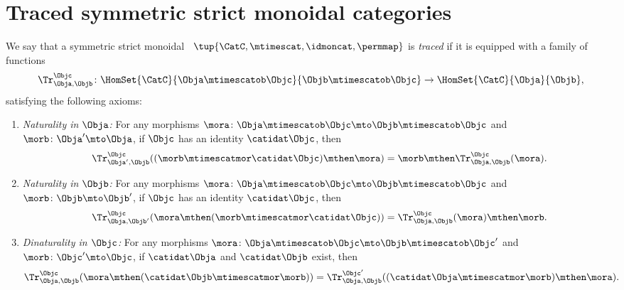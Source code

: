 
\section{Traced symmetric strict monoidal categories}
\publictodomessage


\begin{widepar}
    \begin{ctdefinition}
        \label{def:traced-sym-strict-mon-cat}
        We say that a symmetric strict monoidal  ~$\tup{\CatC, \mtimescat, \idmoncat, \permmap}$ is \emph{traced} if it is equipped with a family of functions
        \begin{equation}\label{eq:trace-def-trace-map}
            \Tr_{\Obja,\Objb}^\Objc\colon \HomSet{\CatC}{\Obja \mtimescatob \Objc}{\Objb\mtimescatob \Objc}\to \HomSet{\CatC}{\Obja}{\Objb},
        \end{equation}
        satisfying the following axioms:
        \begin{enumerate}

            \item \emph{Naturality in $\Obja$:} For any morphisms $\mora\colon \Obja\mtimescatob \Objc \mto \Objb\mtimescatob \Objc$ and $\morb \colon \Obja' \mto \Obja$, if $\Objc$ has an identity $\catidat\Objc$, then
                  \begin{equation}\label{eq:trace-def-naturality-in-source}
                      \Tr_{\Obja', \Objb}^\Objc ( (\morb \mtimescatmor \catidat\Objc) \mthen \mora) = \morb \mthen \Tr_{\Obja, \Objb}^\Objc (\mora).
                  \end{equation}
                  

            \item \emph{Naturality in $\Objb$:}
                  For any morphisms $\mora\colon \Obja\mtimescatob \Objc \mto \Objb\mtimescatob \Objc$ and $\morb \colon \Objb \mto \Objb'$, if $\Objc$ has an identity $\catidat\Objc$, then
                  \begin{equation}\label{eq:trace-def-naturality-in-target}
                      \Tr_{\Obja, \Objb'}^\Objc ( \mora \mthen (\morb \mtimescatmor \catidat\Objc) ) = \Tr_{\Obja, \Objb}^\Objc (\mora) \mthen \morb.
                  \end{equation}

            \item \emph{Dinaturality in $\Objc$:}
                  For any morphisms $\mora \colon \Obja \mtimescatob \Objc \mto \Objb \mtimescatob \Objc'$ and $\morb \colon \Objc' \mto \Objc$, if $\catidat\Obja$ and $\catidat\Objb$ exist, then
                  \begin{equation}\label{eq:trace-def-dinaturality-in-traced-object}
                      \Tr_{\Obja, \Objb}^{\Objc} (\mora \mthen (\catidat\Objb \mtimescatmor \morb)) = \Tr_{\Obja, \Objb}^{\Objc'}((\catidat\Obja \mtimescatmor \morb) \mthen \mora).
                  \end{equation}


\end{enumerate}
\end{ctdefinition}
\end{widepar}
